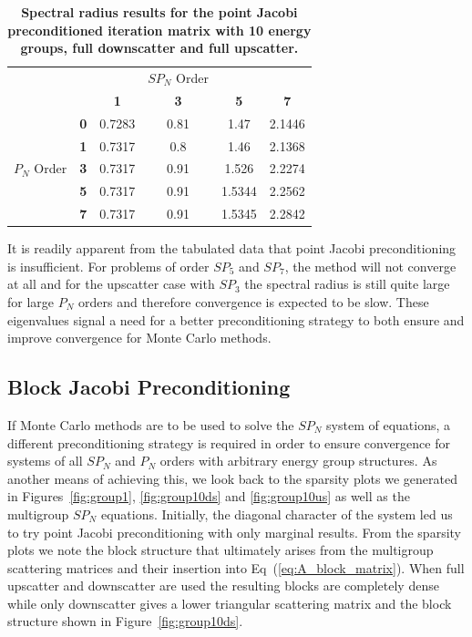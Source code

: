 \begin{table}[h!]
  \begin{center}
    \begin{tabular}{cccccc}\hline\hline
      \multicolumn{1}{c}{}& 
      \multicolumn{1}{c}{}& 
      \multicolumn{1}{c}{}& 
      \multicolumn{1}{c}{$SP_N$ Order}& 
      \multicolumn{1}{c}{}& 
      \multicolumn{1}{c}{} \\
       &   & \textbf{1} & \textbf{3} & \textbf{5} & \textbf{7}  \\
       & \textbf{0} & 0.7283 & 0.81 & 1.47 & 2.1446 \\
       & \textbf{1} & 0.7317 & 0.8 & 1.46 & 2.1368 \\
      $P_N$ Order & \textbf{3} & 0.7317 & 0.91 & 1.526 & 2.2274 \\
       & \textbf{5} & 0.7317 & 0.91 & 1.5344 & 2.2562 \\
       & \textbf{7} & 0.7317 & 0.91 & 1.5345 & 2.2842 \\
      \hline\hline
    \end{tabular}
  \end{center}
  \caption{\textbf{Spectral radius results for the point Jacobi
      preconditioned iteration matrix with 10 energy groups, full
      downscatter and full upscatter.}}
  \label{tab:group10uspj}
\end{table}

It is readily apparent from the tabulated data that point Jacobi
preconditioning is insufficient. For problems of order $SP_5$ and
$SP_7$, the method will not converge at all and for the upscatter case
with $SP_3$ the spectral radius is still quite large for large $P_N$
orders and therefore convergence is expected to be slow. These
eigenvalues signal a need for a better preconditioning strategy to
both ensure and improve convergence for Monte Carlo methods.

\subsection{Block Jacobi Preconditioning}
\label{sec:spn_preconditioning}
If Monte Carlo methods are to be used to solve the $SP_N$ system of
equations, a different preconditioning strategy is required in order
to ensure convergence for systems of all $SP_N$ and $P_N$ orders with
arbitrary energy group structures. As another means of achieving this,
we look back to the sparsity plots we generated in
Figures~\ref{fig:group1}, \ref{fig:group10ds} and \ref{fig:group10us}
as well as the multigroup $SP_N$ equations. Initially, the diagonal
character of the system led us to try point Jacobi preconditioning
with only marginal results. From the sparsity plots we note the block
structure that ultimately arises from the multigroup scattering
matrices and their insertion into Eq~(\ref{eq:A_block_matrix}). When
full upscatter and downscatter are used the resulting blocks are
completely dense while only downscatter gives a lower triangular
scattering matrix and the block structure shown in
Figure~\ref{fig:group10ds}.

